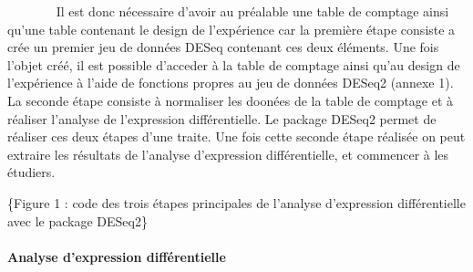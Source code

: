 \documentclass[
  12pt,
]{article}
\newenvironment{Shaded}{\begin{snugshade}}{\end{snugshade}}
\newcommand{\CommentTok}[1]{\textcolor[rgb]{0.56,0.35,0.01}{\textit{#1}}}
\newcommand{\DataTypeTok}[1]{\textcolor[rgb]{0.13,0.29,0.53}{#1}}
\newcommand{\KeywordTok}[1]{\textcolor[rgb]{0.13,0.29,0.53}{\textbf{#1}}}
\newcommand{\NormalTok}[1]{#1}
\newcommand{\OperatorTok}[1]{\textcolor[rgb]{0.81,0.36,0.00}{\textbf{#1}}}
\newcommand{\OtherTok}[1]{\textcolor[rgb]{0.56,0.35,0.01}{#1}}
\newcommand{\StringTok}[1]{\textcolor[rgb]{0.31,0.60,0.02}{#1}}
\begin{document}
\par

~~~~~~~ Il est donc nécessaire d'avoir au préalable une table de
comptage ainsi qu'une table contenant le design de l'expérience car la
première étape consiste a crée un premier jeu de données DESeq contenant
ces deux éléments. Une fois l'objet créé, il est possible d'acceder à la
table de comptage ainsi qu'au design de l'expérience à l'aide de
fonctions propres au jeu de données DESeq2 (annexe 1). La seconde étape
consiste à normaliser les doonées de la table de comptage et à réaliser
l'analyse de l'expression différentielle. Le package DESeq2 permet de
réaliser ces deux étapes d'une traite. Une fois cette seconde étape
réalisée on peut extraire les résultats de l'analyse d'expression
différentielle, et commencer à les étudiers.

\singlespacing
\scriptsize

\begin{Shaded}
\end{Shaded}

\normalsize

\sffamily\small\{Figure 1 : code des trois étapes principales de
l'analyse d'expression différentielle avec le package DESeq2\}
\normalsize


\newpage

\hypertarget{analyse-dexpression-diffuxe9rentielle}{%
\paragraph{Analyse d'expression
différentielle}\label{analyse-dexpression-diffuxe9rentielle}}
\end{document}
